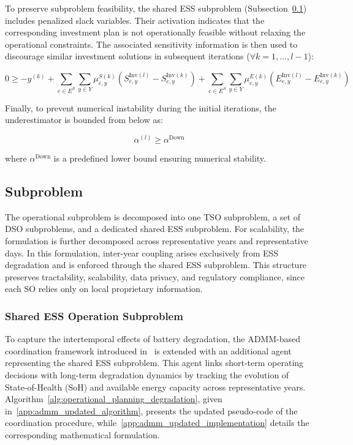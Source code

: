 \documentclass[preprint,12pt]{elsarticle}
\begin{document}
To preserve subproblem feasibility, the shared ESS subproblem (Subsection~\ref{subsec:subproblem}) includes penalized slack variables. Their activation indicates that the corresponding investment plan is not operationally feasible without relaxing the operational constraints. The associated sensitivity information is then used to discourage similar investment solutions in subsequent iterations ($\forall k = 1, \ldots, l-1$):

\begin{equation}
    0 \geq -y^{(k)} 
    + 
    \sum_{e \in E^S}\sum_{y \in Y}
    \mu^{S(k)}_{e,y} \left( S^{\text{Inv}(l)}_{e,y} - S^{\text{Inv}(k)}_{e,y} \right) 
    + 
    \sum_{e \in E^S}\sum_{y \in Y}
    \mu^{E(k)}_{e,y} \left( E^{\text{Inv}(l)}_{e,y} - E^{\text{Inv}(k)}_{e,y} \right)
\end{equation}

Finally, to prevent numerical instability during the initial iterations, the underestimator is bounded from below as:

\begin{equation}
    \alpha^{(l)} \geq \alpha^{\text{Down}}
\end{equation}

\noindent
where $\alpha^{\text{Down}}$ is a predefined lower bound ensuring numerical stability.

\subsection{Subproblem}
\label{subsec:subproblem}

The operational subproblem is decomposed into one TSO subproblem, a set of DSO subproblems, and a dedicated shared ESS subproblem. For scalability, the formulation is further decomposed across representative years and representative days. In this formulation, inter-year coupling arises exclusively from ESS degradation and is enforced through the shared ESS subproblem. This structure preserves tractability, scalability, data privacy, and regulatory compliance, since each SO relies only on local proprietary information.

\subsubsection{Shared ESS Operation Subproblem}

To capture the intertemporal effects of battery degradation, the ADMM-based coordination framework introduced in~\cite{simoes_2023} is extended with an additional agent representing the shared ESS subproblem. This agent links short-term operating decisions with long-term degradation dynamics by tracking the evolution of State-of-Health (SoH) and available energy capacity across representative years. Algorithm~\ref{alg:operational_planning_degradation}, given in~\ref{app:admm_updated_algorithm}, presents the updated pseudo-code of the coordination procedure, while~\ref{app:admm_updated_implementation} details the corresponding mathematical formulation.
\end{document}
